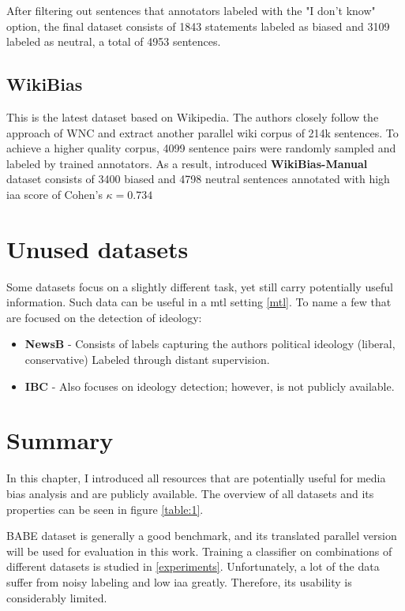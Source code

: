 After filtering out sentences that annotators labeled with the "I don't know" option, the final dataset consists of 1843 statements labeled as biased and 3109 labeled as neutral, a total of 4953 sentences.




\subsection{WikiBias}
This is the latest dataset based on Wikipedia. The authors \cite{zhong-etal-2021-wikibias-detecting} closely follow the approach of WNC \cite{pryzant2020automatically} and extract another parallel wiki corpus of 214k sentences.
To achieve a higher quality corpus, 4099 sentence pairs were randomly sampled and labeled by trained annotators. As a result, introduced \textbf{WikiBias-Manual} dataset consists of 3400 biased and 4798 neutral sentences annotated with high \gls{iaa} score of Cohen's $\kappa = 0.734$





\section{Unused datasets}
 Some datasets focus on a slightly different task, yet still carry potentially useful information. Such data can be useful in a \gls{mtl} setting \ref{mtl}. To name a few that are focused on the detection of ideology:
\begin{itemize}
\item \textbf{NewsB} - 
Consists of labels capturing the authors political ideology (liberal, conservative) Labeled through distant supervision.
\item \textbf{IBC} - Also focuses on ideology detection; however, is not publicly available.
\end{itemize}


\section{Summary}
In this chapter, I introduced all resources that are potentially useful for media bias analysis and are publicly available. The overview of all datasets and its properties can be seen in figure \ref{table:1}.

BABE dataset is generally a good benchmark, and its translated parallel version will be used for evaluation in this work. Training a classifier on combinations of different datasets is studied in \ref{experiments}. Unfortunately, a lot of the data suffer from noisy labeling and low \gls{iaa} greatly. Therefore, its usability is considerably limited.
